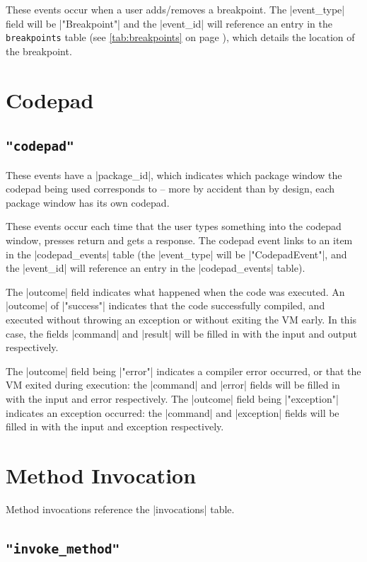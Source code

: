 \documentclass{report}
\newcommand{\myref}[1]{\autoref{#1} on page \pageref*{#1}}
\newcommand{\tabref}[1]{\lstinline|#1| table (see \myref{tab:#1})}
\begin{document}
These events occur when a user adds/removes a breakpoint.  The |event_type|
field will be |"Breakpoint"| and the |event_id| will reference an entry in
the \tabref{breakpoints}, which details the location of the breakpoint.


\section{Codepad}

\subsection{\lstinline!"codepad"!}

These events have a |package_id|, which indicates which package window the
codepad being used corresponds to -- more by accident than by design, each
package window has its own codepad.

These events occur each time that the user types something into the codepad
window, presses return and gets a response.  The codepad event links to an item in the |codepad_events| table (the
|event_type| will be |"CodepadEvent"|, and the |event_id| will reference an
entry in the |codepad_events| table).


The |outcome| field indicates what happened when the code was
executed.  An |outcome| of |"success"| indicates that the code
successfully compiled, and executed without throwing an exception or without
exiting the VM early.  In this case, the fields |command| and |result|
will be filled in with the input and output respectively.


The |outcome| field being |"error"| indicates a compiler error occurred, or that the VM
exited during execution: the |command| and |error| fields will be filled in with the
input and error respectively.  The |outcome| field being |"exception"|
indicates an exception occurred: the |command| and |exception| fields
will be filled in with the input and exception respectively.


\section{Method Invocation}

Method invocations reference the |invocations| table.


\subsection{\lstinline!"invoke_method"!}
\end{document}
